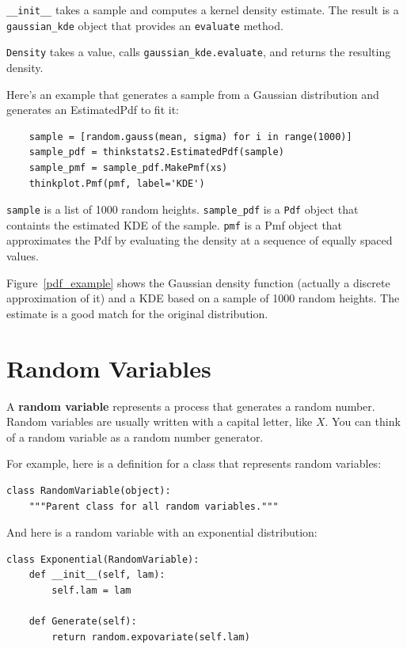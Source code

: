 \documentclass[12pt]{book}
\begin{document}
\verb"__init__" takes a sample
and computes a kernel density estimate.  The result is a
\verb"gaussian_kde" object that provides an {\tt evaluate}
method.

{\tt Density} takes a value, calls \verb"gaussian_kde.evaluate",
and returns the resulting density.

Here's an example that generates a sample from a Gaussian
distribution and generates an EstimatedPdf to fit it:

\begin{verbatim}
    sample = [random.gauss(mean, sigma) for i in range(1000)]
    sample_pdf = thinkstats2.EstimatedPdf(sample)
    sample_pmf = sample_pdf.MakePmf(xs)
    thinkplot.Pmf(pmf, label='KDE')
\end{verbatim}

\verb"sample" is a list of 1000 random heights.
\verb"sample_pdf" is a {\tt Pdf} object that containts the estimated
KDE of the sample.  {\tt pmf} is a Pmf object that approximates the Pdf by
evaluating the density at a sequence of equally spaced values.

Figure~\ref{pdf_example} shows the Gaussian density function (actually
a discrete approximation of it) and a KDE based on a sample of 1000
random heights.  The estimate is a good match for the original
distribution.



\section{Random Variables}

A {\bf random variable} represents a process that generates a random
number.  Random variables are usually written with a capital letter,
like $X$.  You can think of a random variable as a random number
generator.

For example, here is a definition for a class that represents
random variables:
%
\begin{verbatim}
class RandomVariable(object):
    """Parent class for all random variables."""
\end{verbatim}

And here is a random variable with an exponential distribution:
%
\begin{verbatim}
class Exponential(RandomVariable):
    def __init__(self, lam):
        self.lam = lam

    def Generate(self):
        return random.expovariate(self.lam)
\end{verbatim}
\end{document}

